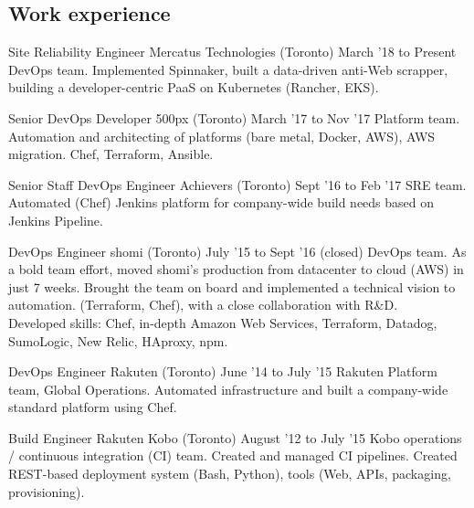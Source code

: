 \documentclass[]{cvpn}
\begin{document}
\cvheader{}

     {\def\gitrev{\unskip}}
     {\def\gitrev{unknown}}
\cvtag{\gitrev}

\begin{multicols}{2}
\section{Work experience}
\begin{eventlist}

\item{Site Reliability Engineer}
     {Mercatus Technologies (Toronto)}
     {March '18 to Present}
{
DevOps team.
Implemented Spinnaker,
built a data-driven anti-Web scrapper,
building a developer-centric PaaS on Kubernetes
(Rancher, EKS).
}

\item{Senior DevOps Developer}
     {500px (Toronto)}
     {March '17 to Nov '17}
{
Platform team.
Automation and architecting of platforms
(bare metal, Docker, AWS),
AWS migration. Chef, Terraform, Ansible.
}

\item{Senior Staff DevOps Engineer}
     {Achievers (Toronto)}
     {Sept '16 to Feb '17}
{
SRE team.
Automated (Chef) Jenkins platform for company-wide build
needs based on Jenkins Pipeline.
}

\item{DevOps Engineer}
     {shomi (Toronto)}
     {July '15 to Sept '16 (closed)}
{
DevOps team. As a bold team effort, moved shomi's
production from datacenter to cloud (AWS) in just 7 weeks.
Brought the team on board and implemented a technical
vision to automation. (Terraform, Chef),
with a close collaboration with R\&D.\\

Developed skills: Chef, in-depth Amazon Web Services,
Terraform, Datadog, SumoLogic, New Relic, HAproxy, npm.
}

\item{DevOps Engineer}
     {Rakuten (Toronto)}
     {June '14 to July '15}
{
Rakuten Platform team, Global Operations.
Automated infrastructure and built a company-wide
standard platform using Chef.
}

\item{Build Engineer}
     {Rakuten Kobo (Toronto)}
     {August '12 to July '15}
{
Kobo operations / continuous integration (CI) team.
Created and managed CI pipelines.
Created REST-based deployment system (Bash, Python),
tools (Web, APIs, packaging, provisioning).\\

}
\end{eventlist}
\end{multicols}
\end{document}
